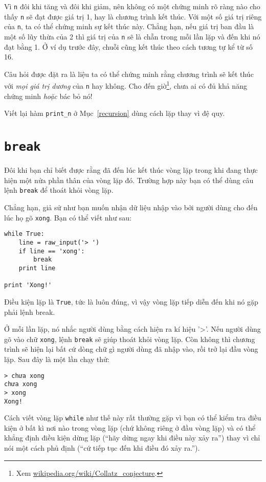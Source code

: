 \documentclass[11pt]{book}
\begin{document}
Vì {\tt n} đôi khi tăng và đôi khi giảm, nên không có một chứng minh
rõ ràng nào cho thấy {\tt n} sẽ đạt được giá trị 1, hay là chương trình
kết thúc. Với một số giá trị riêng của {\tt n}, ta có thể chứng minh sự
kết thúc này. Chẳng hạn, nếu giá trị ban đầu là một số lũy thừa của 
2 thì giá trị của {\tt n} sẽ là chẵn trong mỗi lần lặp và đến khi nó đạt
bằng 1. Ở ví dụ trước đây, chuỗi cũng kết thúc theo cách tương tự kể
từ số 16.


Câu hỏi được đặt ra là liệu ta có thể chứng minh rằng chương trình sẽ
kết thúc với {\em mọi giá trị dương} của {\tt n} hay không. Cho đến giờ\footnote{Xem
  \url{wikipedia.org/wiki/Collatz_conjecture}.}, chưa ai có đủ khả năng
chứng minh {\em hoặc} bác bỏ nó!

\begin{ex}
Viết lại hàm \verb"print_n" ở 
Mục~\ref{recursion} dùng cách lặp thay vì đệ quy.
\end{ex}


\section{{\tt break}}

Đôi khi bạn chỉ biết được rằng đã đến lúc kết thúc vòng lặp trong khi
đang thực hiện một nửa phần thân của vòng lặp đó. Trường hợp này
bạn có thể dùng câu lệnh {\tt break} để thoát khỏi vòng lặp.

Chẳng hạn, giả sử như bạn muốn nhận dữ liệu nhập vào bởi người dùng
cho đến lúc họ gõ {\tt xong}. Bạn có thể viết như sau:

\beforeverb
\begin{verbatim}
while True:
    line = raw_input('> ')
    if line == 'xong':
        break
    print line

print 'Xong!'
\end{verbatim}
\afterverb
%
Điều kiện lặp là {\tt True}, tức là luôn đúng, vì vậy vòng lặp tiếp diễn
đến khi nó gặp phải lệnh break.

Ở mỗi lần lặp, nó nhắc người dùng bằng cách hiện ra kí hiệu '>'. 
Nếu người dùng gõ vào chữ {\tt xong}, lệnh {\tt break} sẽ giúp
thoát khỏi vòng lặp. Còn không thì chương trình sẽ hiện lại bất cứ
dòng chữ gì người dùng đã nhập vào, rồi trở lại đầu vòng lặp. Sau
đây là một lần chạy thử:

\beforeverb
\begin{verbatim}
> chưa xong
chưa xong
> xong
Xong!
\end{verbatim}
\afterverb
%
Cách viết vòng lặp {\tt while} như thế này rất thường gặp vì bạn có thể
kiểm tra điều kiện ở bất kì nơi nào trong vòng lặp (chứ không riêng
ở đầu vòng lặp) và có thể khẳng định điều kiện dừng lặp (``hãy dừng
ngay khi điều này xảy ra'') thay vì chỉ nói một cách phủ định (``cứ tiếp
tục đến khi điều đó xảy ra.'').
\end{document}
